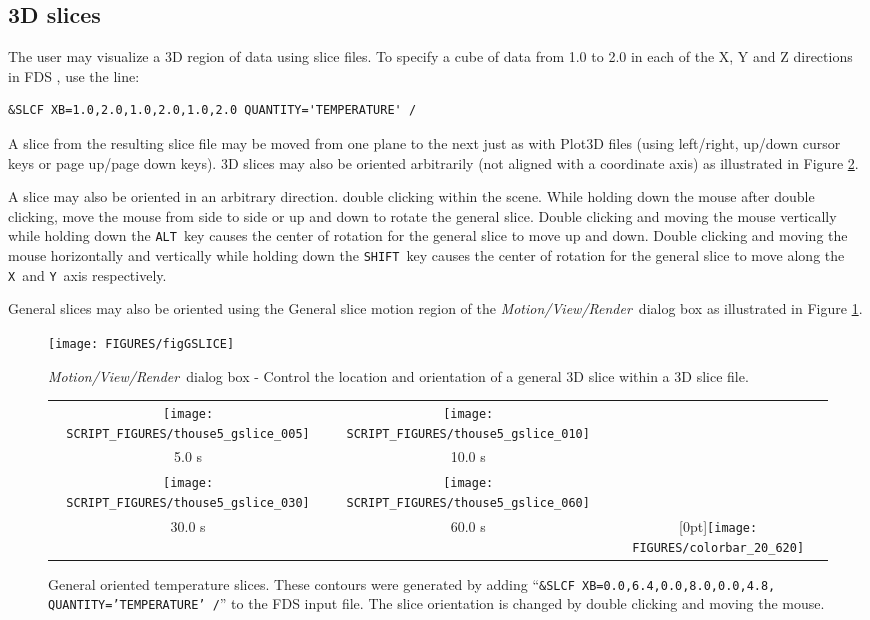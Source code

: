 \documentclass[11pt,twoside]{book}
\begin{document}
\subsection{3D slices}
The user may visualize a 3D region of data using slice files.
To specify a cube of data from 1.0 to 2.0 in each
of the X, Y and Z directions in FDS , use the line:
\begin{lstlisting}
&SLCF XB=1.0,2.0,1.0,2.0,1.0,2.0 QUANTITY='TEMPERATURE' /
\end{lstlisting}

A slice from the resulting slice file
may be moved from one plane to the next just as with Plot3D
files (using left/right, up/down cursor keys or page up/page down
keys).  3D slices may also be oriented arbitrarily (not aligned with a coordinate
axis) as illustrated in Figure \ref{figgslice}.

A slice may also be oriented in an arbitrary direction.
double clicking within the scene.  While holding down the mouse after double clicking,
move the mouse from
side to side or up and down to rotate the general slice.  Double clicking and moving
the mouse vertically while holding down the {\tt ALT}\
key causes the center of rotation for the general slice to move up and down.
Double clicking and moving the mouse horizontally and vertically while holding down
the {\tt SHIFT}\ key causes the center of rotation for the general slice to move along
the {\tt X}\ and {\tt Y}\ axis respectively.

General slices may also be oriented using the General slice motion
region of the {\em Motion/View/Render}\ dialog box as illustrated
in Figure \ref{figGSLICE}.

\begin{figure}[\figoptions]
\centerline{
\texttt{[image: FIGURES/figGSLICE]}
} \caption[{\em Motion/View/Render}\ dialog box - General slice
regions.]{{\em Motion/View/Render}\ dialog box - Control the
location and orientation of a general 3D slice within a 3D slice
file.} \label{figGSLICE}
\end{figure}


\begin{figure}[\figoptions]
\begin{center}
\begin{tabular}{ccc}
\texttt{[image: SCRIPT\_FIGURES/thouse5\_gslice\_005]}&
\texttt{[image: SCRIPT\_FIGURES/thouse5\_gslice\_010]}\\
5.0 s&10.0 s\\
\texttt{[image: SCRIPT\_FIGURES/thouse5\_gslice\_030]}&
\texttt{[image: SCRIPT\_FIGURES/thouse5\_gslice\_060]}&\\
30.0 s&60.0 s
&\raisebox{0.0ex}[0pt]{\texttt{[image: FIGURES/colorbar\_20\_620]}}\\
\end{tabular}
\caption [General oriented temperature slices.]
{General oriented temperature slices.
These contours were generated by adding
``{\tt \&SLCF XB=0.0,6.4,0.0,8.0,0.0,4.8, QUANTITY='TEMPERATURE' /}'' to the FDS
input file. The slice orientation is changed by double clicking and moving the mouse.}
\label{figgslice}%
\end{center}
\end{figure}
\end{document}
